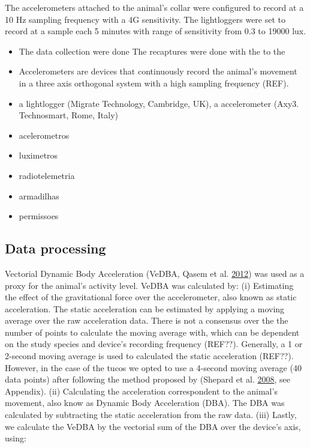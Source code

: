 \documentclass[msc,numbers,hidelinks]{coppe}
\providecommand{\tightlist}{%
  \setlength{\itemsep}{0pt}\setlength{\parskip}{0pt}}
\begin{document}
  The accelerometers attached to the animal's collar were configured to record at a 10 Hz sampling frequency with a 4G sensitivity. The lightloggers were set to record at a sample each 5 minutes with range of sensitivity from 0.3 to 19000 lux.
  \begin{itemize}
  \tightlist
  \item
    The data collection were done The recaptures were done with the to the
  \item
    Accelerometers are devices that continuously record the animal's movement in a three axis orthogonal system with a high sampling frequency (REF).
  \item
    a lightlogger (Migrate Technology, Cambridge, UK), a accelerometer (Axy3. Technosmart, Rome, Italy)
  \item
    acelerometros
  \item
    luximetros
  \item
    radiotelemetria
  \item
    armadilhas
  \item
    permissoes
  \end{itemize}
  \hypertarget{data-processing}{%
  \subsection{Data processing}\label{data-processing}}

  Vectorial Dynamic Body Acceleration (VeDBA, Qasem et al. \protect\hyperlink{ref-qasemTriAxialDynamicAcceleration2012}{2012}) was used as a proxy for the animal's activity level. VeDBA was calculated by: (i) Estimating the effect of the gravitational force over the accelerometer, also known as static acceleration. The static acceleration can be estimated by applying a moving average over the raw acceleration data. There is not a consensus over the the number of points to calculate the moving average with, which can be dependent on the study species and device's recording frequency (REF??). Generally, a 1 or 2-second moving average is used to calculated the static acceleration (REF??). However, in the case of the tucos we opted to use a 4-second moving average (40 data points) after following the method proposed by (Shepard et al. \protect\hyperlink{ref-shepardDerivationBodyMotion2008}{2008}, see Appendix). (ii) Calculating the acceleration correspondent to the animal's movement, also know as Dynamic Body Acceleration (DBA). The DBA was calculated by subtracting the static acceleration from the raw data. (iii) Lastly, we calculate the VeDBA by the vectorial sum of the DBA over the device's axis, using:
\end{document}
